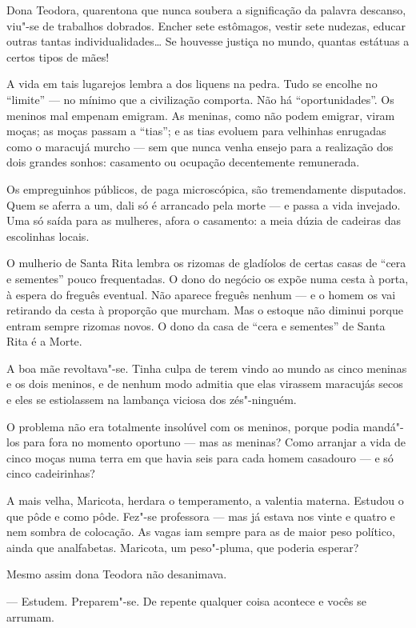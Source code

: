 Dona Teodora, quarentona que nunca soubera a significação da palavra
descanso, viu"-se de trabalhos dobrados. Encher sete estômagos, vestir
sete nudezas, educar outras tantas individualidades\ldots{} Se houvesse
justiça no mundo, quantas estátuas a certos tipos de mães!

A vida em tais lugarejos lembra a dos liquens na pedra. Tudo se encolhe
no ``limite'' --- no mínimo que a civilização comporta. Não há
``oportunidades''. Os meninos mal empenam emigram. As meninas, como não
podem emigrar, viram moças; as moças passam a ``tias''; e as tias
evoluem para velhinhas enrugadas como o maracujá murcho --- sem que
nunca venha ensejo para a realização dos dois grandes sonhos: casamento
ou ocupação decentemente remunerada.

Os empreguinhos públicos, de paga microscópica, são tremendamente
disputados. Quem se aferra a um, dali só é arrancado pela morte --- e
passa a vida invejado. Uma só saída para as mulheres, afora o casamento:
a meia dúzia de cadeiras das escolinhas locais.

O mulherio de Santa Rita lembra os rizomas de gladíolos de certas casas
de ``cera e sementes'' pouco frequentadas. O dono do negócio os expõe
numa cesta à porta, à espera do freguês eventual. Não aparece freguês
nenhum --- e o homem os vai retirando da cesta à proporção que murcham.
Mas o estoque não diminui porque entram sempre rizomas novos. O dono da
casa de ``cera e sementes'' de Santa Rita é a Morte.

A boa mãe revoltava"-se. Tinha culpa de terem vindo ao mundo as cinco
meninas e os dois meninos, e de nenhum modo admitia que elas virassem
maracujás secos e eles se estiolassem na lambança viciosa dos
zés"-ninguém.

O problema não era totalmente insolúvel com os meninos, porque podia
mandá"-los para fora no momento oportuno --- mas as meninas? Como
arranjar a vida de cinco moças numa terra em que havia seis para cada
homem casadouro --- e só cinco cadeirinhas?

A mais velha, Maricota, herdara o temperamento, a valentia materna.
Estudou o que pôde e como pôde. Fez"-se professora --- mas já estava nos
vinte e quatro e nem sombra de colocação. As vagas iam sempre para as de
maior peso político, ainda que analfabetas. Maricota, um peso"-pluma, que
poderia esperar?

Mesmo assim dona Teodora não desanimava.

--- Estudem. Preparem"-se. De repente qualquer coisa acontece e vocês se
arrumam.

